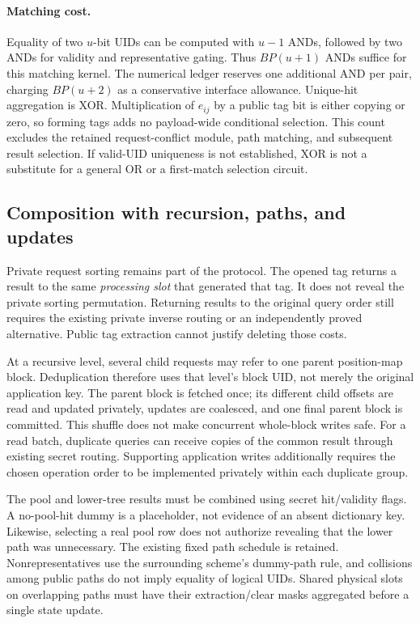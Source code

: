 \documentclass[11pt]{article}
\begin{document}
\paragraph{Matching cost.}
Equality of two $u$-bit UIDs can be computed with $u-1$ ANDs, followed by
two ANDs for validity and representative gating.  Thus $BP(u+1)$ ANDs suffice
for this matching kernel.  The numerical ledger reserves one additional
AND per pair, charging $BP(u+2)$ as a conservative interface allowance.
Unique-hit aggregation is XOR.  Multiplication
of $e_{ij}$ by a public tag bit is either copying or zero, so forming tags
adds no payload-wide conditional selection.  This count excludes the
retained request-conflict module, path matching, and subsequent result
selection.  If valid-UID uniqueness is not established, XOR is not a
substitute for a general OR or a first-match selection circuit.

\subsection{Composition with recursion, paths, and updates}

Private request sorting remains part of the protocol.  The opened tag
returns a result to the same \emph{processing slot} that generated that tag.
It does not reveal the private sorting permutation.  Returning results to
the original query order still requires the existing private inverse
routing or an independently proved alternative.  Public tag extraction
cannot justify deleting those costs.

At a recursive level, several child requests may refer to one parent
position-map block.  Deduplication therefore uses that level's block UID,
not merely the original application key.  The parent block is fetched once;
its different child offsets are read and updated privately, updates are
coalesced, and one final parent block is committed.  This shuffle does not
make concurrent whole-block writes safe.  For a read batch, duplicate
queries can receive copies of the common result through existing secret
routing.  Supporting application writes additionally requires the chosen
operation order to be implemented privately within each duplicate group.

The pool and lower-tree results must be combined using secret hit/validity
flags.  A no-pool-hit dummy is a placeholder, not evidence of an absent
dictionary key.  Likewise, selecting a real pool row does not authorize
revealing that the lower path was unnecessary.  The existing fixed path
schedule is retained.  Nonrepresentatives use the surrounding scheme's
dummy-path rule, and collisions among public paths do not imply equality
of logical UIDs.  Shared physical slots on overlapping paths must have
their extraction/clear masks aggregated before a single state update.
\end{document}
